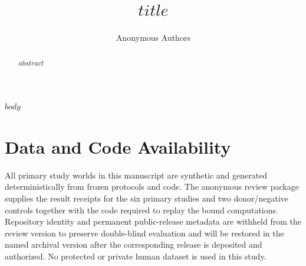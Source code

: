 \documentclass[10pt]{article}
\title{$title$}
\author{Anonymous Authors}
\date{}
\begin{document}
\maketitle
\begingroup
\renewcommand\thefootnote{}
\addtocounter{footnote}{-1}
\endgroup

\begin{abstract}
$abstract$
\end{abstract}

$body$

\section*{Data and Code Availability}
All primary study worlds in this manuscript are synthetic and generated deterministically
from frozen protocols and code. The anonymous review package supplies the result receipts for
the six primary studies and two donor/negative controls together with the code required to
replay the bound computations. Repository identity and permanent public-release metadata are
withheld from the review version to preserve double-blind evaluation and will be restored in
the named archival version after the corresponding release is deposited and authorized. No
protected or private human dataset is used in this study.



\end{document}
